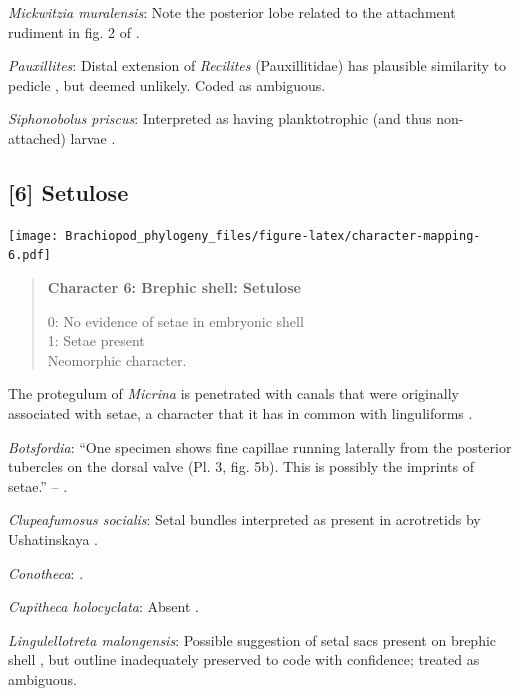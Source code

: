 \documentclass[openany]{book}
\begin{document}
\hypertarget{Mickwitzia_muralensis-coding-5}{}
\emph{Mickwitzia muralensis}: Note the posterior lobe related to the
attachment rudiment in fig. 2 of \citet{Balthasar2009Thebrachiopod}.

\hypertarget{Pauxillites-coding-5}{}
\emph{Pauxillites}: Distal extension of \emph{Recilites} (Pauxillitidae)
has plausible similarity to pedicle \citep{Dzik1978}, but deemed
unlikely. Coded as ambiguous.

\hypertarget{Siphonobolus_priscus-coding-5}{}
\emph{Siphonobolus priscus}: Interpreted as having planktotrophic (and
thus non-attached) larvae \citep{Popov2009Earlyontogeny}.

\subsection*{{[}6{]} Setulose}\label{setulose}

\texttt{[image: Brachiopod\_phylogeny\_files/figure-latex/character-mapping-6.pdf]}

\begin{quote}
\textbf{Character 6: Brephic shell: Setulose}

0: No evidence of setae in embryonic shell\\
1: Setae present\\
Neomorphic character.
\end{quote}

The protegulum of \emph{Micrina} is penetrated with canals that were
originally associated with setae, a character that it has in common with
linguliforms \citep{Holmer2011Firstrecord}.

\hypertarget{Botsfordia-coding-6}{}
\emph{Botsfordia}: ``One specimen shows fine capillae running laterally
from the posterior tubercles on the dorsal valve (Pl. 3, fig. 5b). This
is possibly the imprints of setae.'' --
\citet{Ushatinskaya2016Revisionof}.

\hypertarget{Clupeafumosus_socialis-coding-6}{}
\emph{Clupeafumosus socialis}: Setal bundles interpreted as present in
acrotretids by Ushatinskaya \citeyearpar{Ushatinskaya2016Protegulumand}.

\hypertarget{Conotheca-coding-6}{}
\emph{Conotheca}: \citep{Wrona2003}.

\hypertarget{Cupitheca_holocyclata-coding-6}{}
\emph{Cupitheca holocyclata}: Absent \citep{Skovsted2016}.

\hypertarget{Lingulellotreta_malongensis-coding-6}{}
\emph{Lingulellotreta malongensis}: Possible suggestion of setal sacs
present on brephic shell \citep{Holmer1997EarlyCambrian, Li2004}, but
outline inadequately preserved to code with confidence; treated as
ambiguous.
\end{document}
